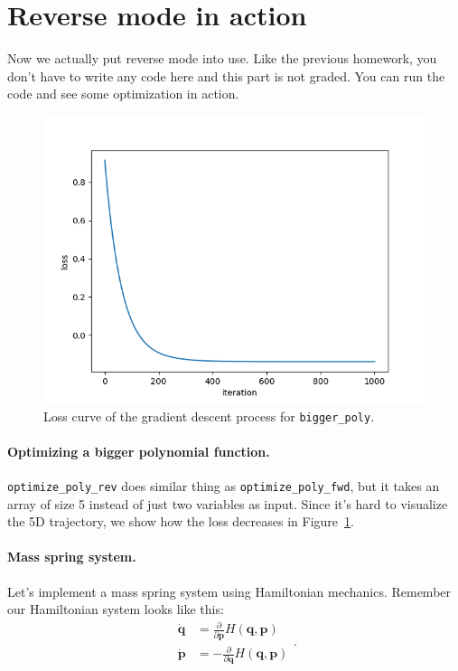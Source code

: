 \section{Reverse mode in action}
Now we actually put reverse mode into use. Like the previous homework, you don't have to write any code here and this part is not graded. You can run the code and see some optimization in action. 

\begin{figure}
\centering
\includegraphics[width=0.8\linewidth]{imgs/loss-bigger-poly.png}
\caption{Loss curve of the gradient descent process for \lstinline{bigger_poly}.}
\label{fig:optimize}
\end{figure}

\paragraph{Optimizing a bigger polynomial function.} \lstinline{optimize_poly_rev} does similar thing as \lstinline{optimize_poly_fwd}, but it takes an array of size 5 instead of just two variables as input. Since it's hard to visualize the 5D trajectory, we show how the loss decreases in Figure~\ref{fig:optimize}.

\paragraph{Mass spring system.} Let's implement a mass spring system using Hamiltonian mechanics. Remember our Hamiltonian system looks like this:
\begin{equation}
\begin{aligned}
\dot{\mathbf{q}} &= \frac{\partial}{\partial \mathbf{p}} H(\mathbf{q}, \mathbf{p}) \\
\dot{\mathbf{p}} &= -\frac{\partial}{\partial \mathbf{q}} H(\mathbf{q}, \mathbf{p})
\end{aligned}.
\end{equation}

